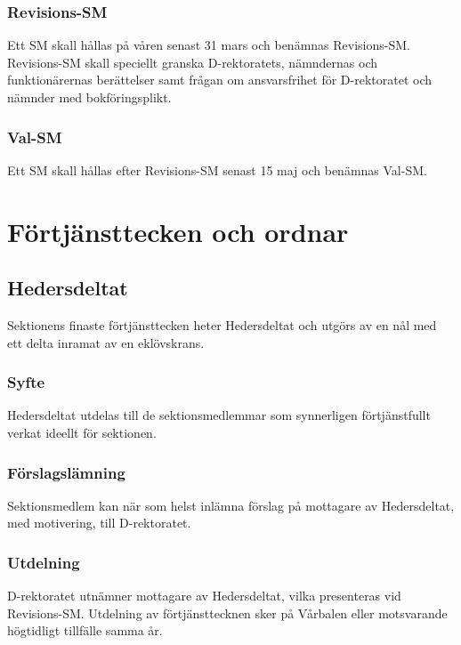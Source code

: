 \documentclass{dgovdoc}
\begin{document}
\subsubsection{Revisions-SM}

Ett SM skall hållas på våren senast 31 mars och benämnas Revisions-SM.
Revisions-SM skall speciellt granska D-rektoratets, nämndernas och
funktionärernas berättelser samt frågan om ansvarsfrihet för D-rektoratet och
nämnder med bokföringsplikt.

\subsubsection{Val-SM}

Ett SM skall hållas efter Revisions-SM senast 15 maj och benämnas Val-SM.

\section{Förtjänsttecken och ordnar}

\subsection{Hedersdeltat}

Sektionens finaste förtjänsttecken heter Hedersdeltat och utgörs av en nål med
ett delta inramat av en eklövskrans.

\subsubsection{Syfte}

Hedersdeltat utdelas till de sektionsmedlemmar som synnerligen förtjänstfullt
verkat ideellt för sektionen.

\subsubsection{Förslagslämning}

Sektionsmedlem kan när som helst inlämna förslag på mottagare av Hedersdeltat,
med motivering, till D-rektoratet.

\subsubsection{Utdelning}

D-rektoratet utnämner mottagare av Hedersdeltat, vilka presenteras vid
Revisions-SM. Utdelning av förtjänsttecknen sker på Vårbalen eller motsvarande
högtidligt tillfälle samma år.
\end{document}
